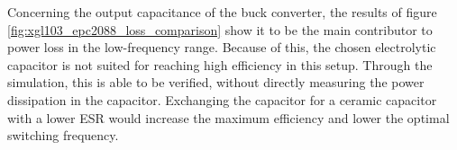 Concerning the output capacitance of the buck converter, the results of figure \ref{fig:xgl103_epc2088_loss_comparison} show it to be the main contributor to power loss in the low-frequency range. Because of this, the chosen electrolytic capacitor is not suited for reaching high efficiency in this setup. Through the simulation, this is able to be verified, without directly measuring the power dissipation in the capacitor. Exchanging the capacitor for a ceramic capacitor with a lower \ac{ESR} would increase the maximum efficiency and lower the optimal switching frequency.